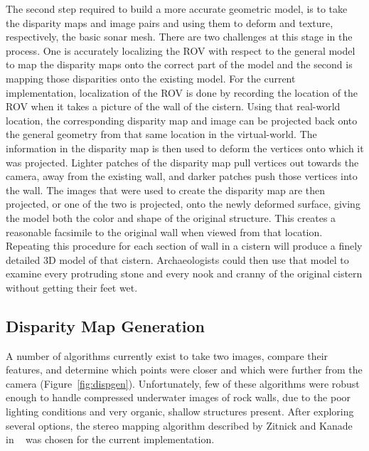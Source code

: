 \documentclass[a4paper,twoside]{article}
\begin{document}
The second step required to build a more accurate geometric model, is to take the disparity maps and image pairs and using them to deform and texture, respectively, the basic sonar mesh. There are two challenges at this stage in the process.  One is accurately localizing the ROV with respect to the general model to map the disparity maps onto the correct part of the model and the second is mapping those disparities onto the existing model.
For the current implementation, localization of the ROV is done by recording the location of the ROV when it takes a picture of the wall of the cistern.  
Using that real-world location, the corresponding disparity map and image can be projected back onto the general geometry from that same location in the virtual-world.
The information in the disparity map is then used to deform the vertices onto which it was projected.
Lighter patches of the disparity map pull vertices out towards the camera, away from the existing wall, and darker patches push those vertices into the wall.
The images that were used to create the disparity map are then projected, or one of the two is projected, onto the newly deformed surface, giving the model both the color and shape of the original structure.  
This creates a reasonable facsimile to the original wall when viewed from that location.  
Repeating this procedure for each section of wall in a cistern will produce a finely detailed 3D model of that cistern.  
Archaeologists could then use that model to examine every protruding stone and every nook and cranny of the original cistern without getting their feet wet.


\subsection{Disparity Map Generation}

\begin{figure*}[!ht]
   \vspace{-0.2cm}
   \caption{How we generate disparity maps from images.}
  \label{fig:dispgen}
 \end{figure*}


A number of algorithms currently exist to take two images, compare their features, and determine which points were closer and which were further from the camera (Figure~\ref{fig:dispgen}). 
Unfortunately, few of these algorithms were robust enough to handle compressed underwater images of rock walls, due to the poor lighting conditions and very organic, shallow structures present.
After exploring several options, the stereo mapping algorithm described by Zitnick and Kanade in ~\cite{stereo:zitKan} was chosen for the current implementation.
\end{document}
